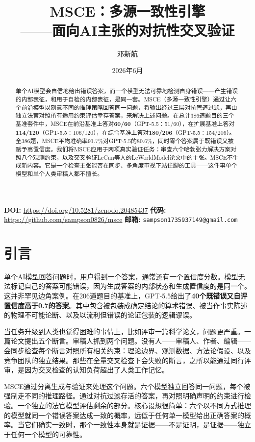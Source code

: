 \documentclass[11pt,a4paper]{ctexart}
\title{\textbf{MSCE：多源一致性引擎\\——面向AI主张的对抗性交叉验证}}
\author{邓新航}
\date{2026年6月}
\begin{document}
\maketitle

\begin{center}
\small
\textbf{DOI:} \url{https://doi.org/10.5281/zenodo.20485437} \quad
\textbf{代码:} \url{https://github.com/sampson0826/msce} \quad
\textbf{邮箱:} \texttt{sampson1735937149@gmail.com}
\end{center}

\vspace{-2mm}

\begin{abstract}
单个AI模型会自信地给出错误答案，而一个模型无法可靠地检测自身错误——产生错误的内部表征，和用于自检的内部表征，是同一套。MSCE（多源一致性引擎）通过让六个前沿模型以刻意不同的推理策略回答同一问题，将输出经过三层对抗管道过滤，再由独立法官对照所有适用约束评估幸存答案，来解决上述问题。在总计386道题目的三个基准套件中，MSCE在前沿基准上答对\textbf{60/60}（GPT-5.5：51/60），在扩展基准上答对\textbf{114/120}（GPT-5.5：106/120），在综合基准上答对\textbf{180/206}（GPT-5.5：154/206）。全386题，MSCE平均准确率91.7\%对GPT-5.5的80.6\%，同时零个答案属于既错误又被赋予高置信度。我们将MSCE应用于两项真实验证任务：审查六个哈勃张力解决方案对照八个观测约束，以及交叉验证LeCun等人的LeWorldModel论文中的主张。MSCE不生成新内容。它是一个检查主张能否在同步、多角度审视下站住脚的工具——这件事单个模型和单个人类审稿人都不擅长。
\end{abstract}

\section{引言}

单个AI模型回答问题时，用户得到一个答案，通常还有一个置信度分数。模型无法标记自己的答案可能错误，因为生成答案的内部状态和生成置信度的是同一个。这并非罕见边角案例。在206道题目的基准上，GPT-5.5给出了\textbf{40个既错误又自评置信度高于0.7的答案}。其中包含被包装成确定结论的算术错误、被当作事实陈述的物理不可能论断、以及以流利但错误的论证包装的逻辑谬误。

当任务升级到人类也觉得困难的事情上，比如评审一篇科学论文，问题更严重。一篇论文提出五个断言。审稿人抓到两个问题。没有人——审稿人、作者、编辑——会同步检查每个断言对照所有相关约束：理论边界、观测数据、方法论假设、以及竞争团队的独立结果。那些在全量交叉检查下会失败的断言，之所以能通过同行评审，是因为交叉检查的认知负荷超出了人类工作记忆。

MSCE通过分离生成与验证来处理这个问题。六个模型独立回答同一问题，每个被强制走不同的推理路径。通过对抗过滤存活的答案，再对照明确声明的约束进行检验。一个独立的法官模型评估剩余的部分。核心设想很简单：六个以不同方式推理的模型就同一个错误答案达成一致的概率，远低于任何单一模型给出正确答案的概率。当它们确实一致时，那个一致性本身就是证据——不是证明，是证据——独立于任何一个模型的可靠性。
\end{document}
